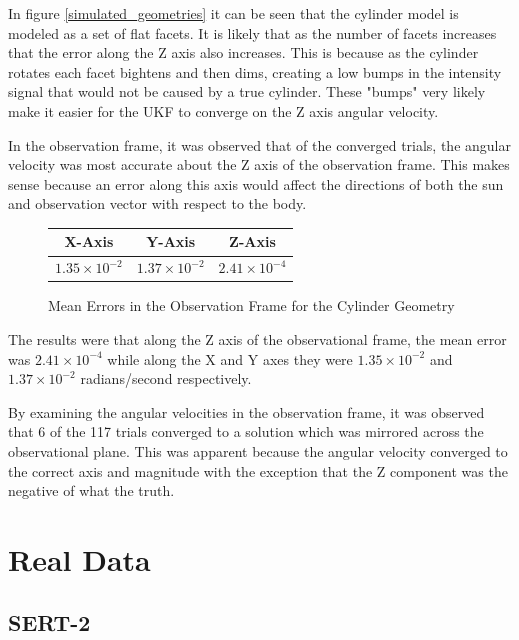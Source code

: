 In figure \ref{simulated_geometries} it can be seen that the cylinder model is modeled as a set of flat facets. It is likely that as the number of facets increases that the error along the Z axis also increases. This is because as the cylinder rotates each facet bightens and then dims, creating a low bumps in the intensity signal that would not be caused by a true cylinder. These "bumps" very likely make it easier for the UKF to converge on the Z axis angular velocity.

In the observation frame, it was observed that of the converged trials, the angular velocity was most accurate about the Z axis of the observation frame. This makes sense because an error along this axis would affect the directions of both the sun and observation vector with respect to the body. 

\begin{figure}[ht]
\begin{center}
\begin{tabular}{| c | c | c |}
	\hline X-Axis & Y-Axis & Z-Axis \\ 
	\hline $1.35\times 10^{-2}$ & $1.37\times 10^{-2}$ & $2.41\times 10^{-4}$ \\
	\hline
\end{tabular}
\end{center}
\caption{Mean Errors in the Observation Frame for the Cylinder Geometry}
\end{figure}


The results were that along the Z axis of the observational frame, the mean error was $2.41\times 10^{-4}$ while along the X and Y axes they were $1.35\times 10^{-2}$ and $1.37\times 10^{-2}$ radians/second respectively.

By examining the angular velocities in the observation frame, it was observed that 6 of the 117 trials converged to a solution which was mirrored across the observational plane. This was apparent because the angular velocity converged to the correct axis and magnitude with the exception that the Z component was the negative of what the truth.




\section{Real Data}

\subsection{SERT-2}

